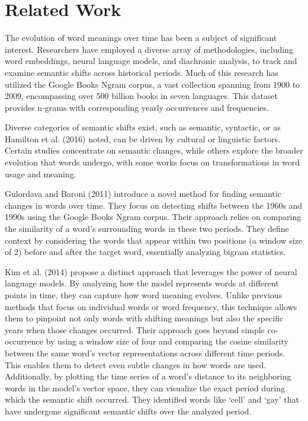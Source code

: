 
\section{Related Work} \label{sec:relatedwork}
The evolution of word meanings over time has been a subject of significant interest.
Researchers have employed a diverse array of methodologies, including word embeddings, neural language models, and diachronic analysis, to track and examine semantic shifts across historical periods.
Much of this research has utilized the Google Books Ngram corpus, a vast collection spanning from 1900 to 2009, encompassing over 500 billion books in seven languages.
This dataset provides n-grams with corresponding yearly occurrences and frequencies.

Diverse categories of semantic shifts exist, such as semantic, syntactic, or as Hamilton et al. (2016) noted, can be driven by cultural or linguistic factors.
Certain studies concentrate on semantic changes, while others explore the broader evolution that words undergo, with some works focus on transformations in word usage and meaning.

\vspace{5mm}
Gulordava and Baroni (2011) introduce a novel method for finding semantic changes in words over time.
They focus on detecting shifts between the 1960s and 1990s using the Google Books Ngram corpus.
Their approach relies on comparing the similarity of a word's surrounding words in these two periods.
They define context by considering the words that appear within two positions (a window size of 2) before and after the target word, essentially analyzing bigram statistics.

Kim et al. (2014) propose a distinct approach that leverages the power of neural language models.
By analyzing how the model represents words at different points in time, they can capture how word meaning evolves.
Unlike previous methods that focus on individual words or word frequency, this technique allows them to pinpoint not only words with shifting meanings but also the specific years when those changes occurred.
Their approach goes beyond simple co-occurrence by using a window size of four and comparing the cosine similarity between the same word's vector representations across different time periods.
This enables them to detect even subtle changes in how words are used.
Additionally, by plotting the time series of a word's distance to its neighboring words in the model's vector space, they can visualize the exact period during which the semantic shift occurred.
They identified words like {\lq{cell}\rq} and {\lq{gay}\rq} that have undergone significant semantic shifts over the analyzed period.

